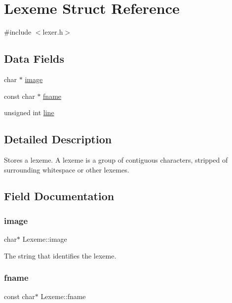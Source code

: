 \hypertarget{struct_lexeme}{}\section{Lexeme Struct Reference}
\label{struct_lexeme}


{\ttfamily \#include $<$lexer.\+h$>$}

\subsection*{Data Fields}
\begin{DoxyCompactItemize}
\item 
char $\ast$ \hyperlink{struct_lexeme_adcdcca00b21c0b8bf3fc7806ea649c55}{image}
\item 
const char $\ast$ \hyperlink{struct_lexeme_a152d5eb7970e35ee25fb59ec0c22ff73}{fname}
\item 
unsigned int \hyperlink{struct_lexeme_af75c22856308b5e1cafcbac2d9308bf0}{line}
\end{DoxyCompactItemize}


\subsection{Detailed Description}
Stores a lexeme. A lexeme is a group of contiguous characters, stripped of surrounding whitespace or other lexemes. 

\subsection{Field Documentation}
\mbox{\label{struct_lexeme_adcdcca00b21c0b8bf3fc7806ea649c55}} 
\subsubsection{\texorpdfstring{image}{image}}
{\footnotesize\ttfamily char$\ast$ Lexeme\+::image}

The string that identifies the lexeme. \mbox{\label{struct_lexeme_a152d5eb7970e35ee25fb59ec0c22ff73}} 
\subsubsection{\texorpdfstring{fname}{fname}}
{\footnotesize\ttfamily const char$\ast$ Lexeme\+::fname}


